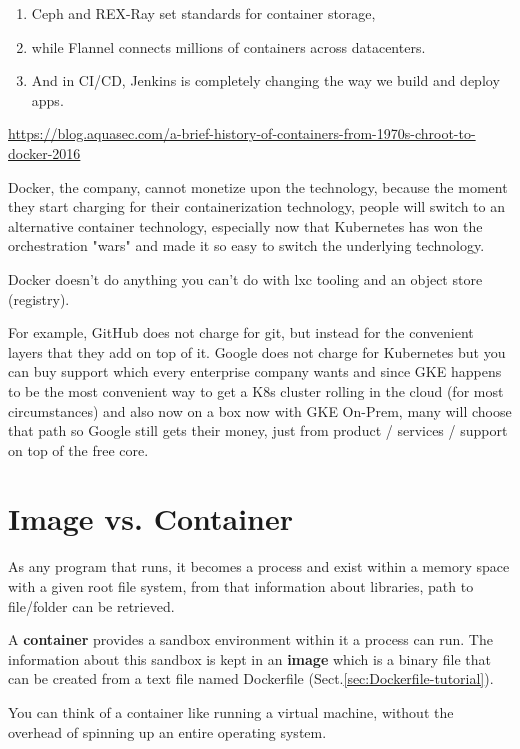 \begin{enumerate}
  \item   Ceph and REX-Ray set standards for container storage, 
  \item while Flannel connects millions of containers across datacenters. 
  
  \item And in CI/CD, Jenkins is completely changing the way we build and deploy apps.
  
\end{enumerate}

\url{https://blog.aquasec.com/a-brief-history-of-containers-from-1970s-chroot-to-docker-2016}


Docker, the company, cannot monetize upon the technology, because the moment
they start charging for their containerization technology, people will switch to
an alternative container technology, especially now that Kubernetes has won the
orchestration "wars" and made it so easy to switch the underlying technology.

Docker doesn’t do anything you can’t do with lxc tooling and an object store
(registry).

For example, GitHub does not charge for git, but instead for the convenient
layers that they add on top of it.
Google does not charge for Kubernetes but you can buy support which every
enterprise company wants and since GKE happens to be the most convenient way to
get a K8s cluster rolling in the cloud (for most circumstances) and also now on
a box now with GKE On-Prem, many will choose that path so Google still gets
their money, just from product / services / support on top of the free core.


\section{Image vs. Container}
\label{sec:Docker-image}

As any program that runs, it becomes a process and exist within a memory space
with a given root file system, from that information about libraries, path to
file/folder can be retrieved.

A {\bf container} provides a sandbox environment within it a process can run.
The information about this sandbox is kept in an {\bf image} which is a binary
file that can be created from a text file named Dockerfile
(Sect.\ref{sec:Dockerfile-tutorial}).

You can think of a container like running a virtual machine, without the
overhead of spinning up an entire operating system.

